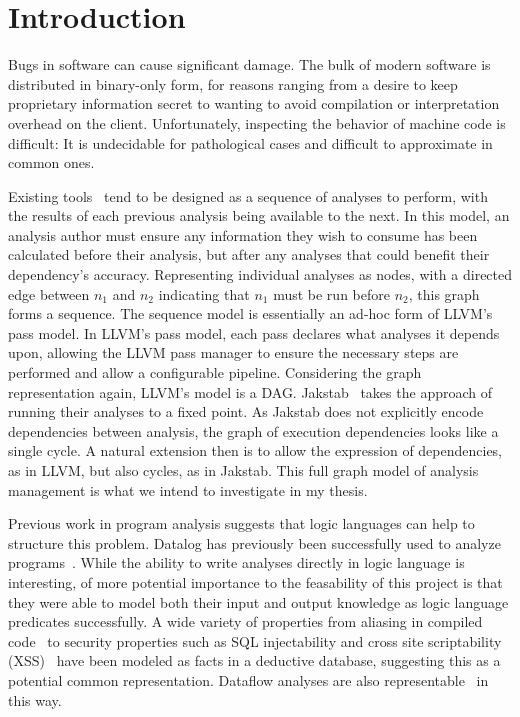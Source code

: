 \chapter{Introduction}
Bugs in software can cause significant damage.
The bulk of modern software is distributed in binary-only form, for reasons ranging from a desire to keep proprietary information secret to wanting to avoid compilation or interpretation overhead on the client.
Unfortunately, inspecting the behavior of machine code is difficult:
It is undecidable for pathological cases and difficult to approximate in common ones.

Existing tools~\cite{ida, bap, bitblaze, bindead} tend to be designed as a sequence of analyses to perform, with the results of each previous analysis being available to the next.
In this model, an analysis author must ensure any information they wish to consume has been calculated before their analysis, but after any analyses that could benefit their dependency's accuracy.
Representing individual analyses as nodes, with a directed edge between $n_1$ and $n_2$ indicating that $n_1$ must be run before $n_2$, this graph forms a sequence.
The sequence model is essentially an ad-hoc form of LLVM\cite{llvm}'s pass model.
In LLVM's pass model, each pass declares what analyses it depends upon, allowing the LLVM pass manager to ensure the necessary steps are performed and allow a configurable pipeline.
Considering the graph representation again, LLVM's model is a DAG.
Jakstab~\cite{jakstab} takes the approach of running their analyses to a fixed point.
As Jakstab does not explicitly encode dependencies between analysis, the graph of execution dependencies looks like a single cycle.
A natural extension then is to allow the expression of dependencies, as in LLVM, but also cycles, as in Jakstab.
This full graph model of analysis management is what we intend to investigate in my thesis.

Previous work in program analysis suggests that logic languages can help to structure this problem.
Datalog has previously been successfully used to analyze programs~\cite{lam2005,brumley2006,alpuente2011,doop1,bddbddb}.
While the ability to write analyses directly in logic language is interesting, of more potential importance to the feasability of this project is that they were able to model both their input and output knowledge as logic language predicates successfully.
A wide variety of properties from aliasing in compiled code~\cite{brumley2006} to security properties such as SQL injectability and cross site scriptability (XSS)~\cite{lam2005} have been modeled as facts in a deductive database, suggesting this as a potential common representation.
Dataflow analyses are also representable~\cite{mcallester2002} in this way.

